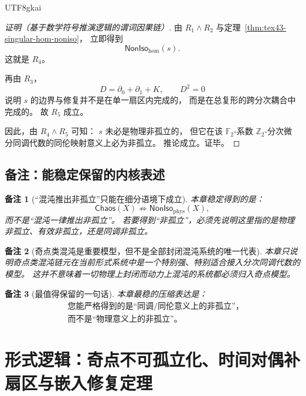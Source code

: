 \documentclass[12pt]{article}
\newtheorem{remark}{备注}[section]
\newcommand{\Ztwo}{\mathbb{Z}_2}
\newcommand{\Ftwo}{\mathbb{F}_2}
\begin{document}
\begin{CJK*}{UTF8}{gkai}
\begin{proof}[证明（基于数学符号推演逻辑的谓词因果链）]
由 $R_1\wedge R_2$ 与定理~\ref{thm:tex43-singular-hom-noniso}，
立即得到
\[
  \mathsf{NonIso}_{\mathrm{hom}}(s).
\]
这就是 $R_4$。

再由 $R_3$，
\[
  D=\partial_0+\partial_1+K,
  \qquad
  D^2=0
\]
说明 $s$ 的边界与修复并不是在单一扇区内完成的，
而是在总复形的跨分次耦合中完成的。
故 $R_5$ 成立。

因此，由 $R_4\wedge R_5$ 可知：
$s$ 未必是物理非孤立的，
但它在该 $\Ftwo$-系数 $\Ztwo$-分次微分同调代数的同伦映射意义上必为非孤立。
推论成立。证毕。
\end{proof}

\subsection{备注：能稳定保留的内核表述}
\label{subsec:tex43-ch6-remarks}

\begin{remark}[“混沌推出非孤立”只能在细分语境下成立]
本章稳定得到的是：
\[
  \mathsf{Chaos}(X)\not\Rightarrow \mathsf{NonIso}_{\mathrm{phys}}(X),
\]
而不是“混沌一律推出非孤立”。
若要得到“非孤立”，必须先说明这里指的是物理非孤立、有效非孤立，还是同调非孤立。
\end{remark}

\begin{remark}[奇点类混沌是重要模型，但不是全部封闭混沌系统的唯一代表]
本章只说明奇点类混沌链元在当前形式系统中是一个特别强、特别适合接入分次同调代数的模型。
这并不意味着一切物理上封闭而动力上混沌的系统都必须归入奇点模型。
\end{remark}

\begin{remark}[最值得保留的一句话]
本章最稳的压缩表达是：
\[
  \boxed{
    \begin{aligned}
      &\text{您能严格得到的是“同调/同伦意义上的非孤立”，}\\
      &\text{而不是“物理意义上的非孤立”。}
    \end{aligned}
  }
\]
\end{remark}

\clearpage

\section{形式逻辑：奇点不可孤立化、时间对偶补扇区与嵌入修复定理}
\label{sec:tex43-ch7}


\end{CJK*}
\end{document}
